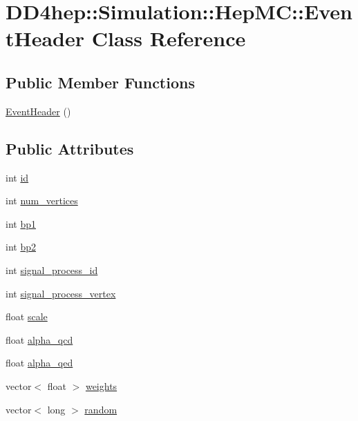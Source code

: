\hypertarget{class_d_d4hep_1_1_simulation_1_1_hep_m_c_1_1_event_header}{
\section{DD4hep::Simulation::HepMC::EventHeader Class Reference}
\label{class_d_d4hep_1_1_simulation_1_1_hep_m_c_1_1_event_header}
}
\subsection*{Public Member Functions}
\begin{DoxyCompactItemize}
\item 
\hyperlink{class_d_d4hep_1_1_simulation_1_1_hep_m_c_1_1_event_header_a7e32471a0f8b744e116a1ae9d0d7e620}{EventHeader} ()
\end{DoxyCompactItemize}
\subsection*{Public Attributes}
\begin{DoxyCompactItemize}
\item 
int \hyperlink{class_d_d4hep_1_1_simulation_1_1_hep_m_c_1_1_event_header_a221f01143ced151a262de45ca6749cc4}{id}
\item 
int \hyperlink{class_d_d4hep_1_1_simulation_1_1_hep_m_c_1_1_event_header_a83354fc882a2fb46a053a524a7145eb1}{num\_\-vertices}
\item 
int \hyperlink{class_d_d4hep_1_1_simulation_1_1_hep_m_c_1_1_event_header_a5c029c436a958d9903c9296823ed2195}{bp1}
\item 
int \hyperlink{class_d_d4hep_1_1_simulation_1_1_hep_m_c_1_1_event_header_a4b3d20b78f49d539c6487d2a5eeb844c}{bp2}
\item 
int \hyperlink{class_d_d4hep_1_1_simulation_1_1_hep_m_c_1_1_event_header_a339a52131b423a70529a66bae821906b}{signal\_\-process\_\-id}
\item 
int \hyperlink{class_d_d4hep_1_1_simulation_1_1_hep_m_c_1_1_event_header_a22408536166a5457c2380e3a06c3ae0c}{signal\_\-process\_\-vertex}
\item 
float \hyperlink{class_d_d4hep_1_1_simulation_1_1_hep_m_c_1_1_event_header_a68ba7289f036ebb18a5ae1d6c602bfa8}{scale}
\item 
float \hyperlink{class_d_d4hep_1_1_simulation_1_1_hep_m_c_1_1_event_header_aa21d0c781608de75c13594b41011c043}{alpha\_\-qcd}
\item 
float \hyperlink{class_d_d4hep_1_1_simulation_1_1_hep_m_c_1_1_event_header_a6ca0fb3012c13d65f7bc3ea095d41a73}{alpha\_\-qed}
\item 
vector$<$ float $>$ \hyperlink{class_d_d4hep_1_1_simulation_1_1_hep_m_c_1_1_event_header_a21a1d471bc6ce75aedfdb9be2db5b0b2}{weights}
\item 
vector$<$ long $>$ \hyperlink{class_d_d4hep_1_1_simulation_1_1_hep_m_c_1_1_event_header_af705e3b582d71aef2b82d27e1056952b}{random}
\end{DoxyCompactItemize}


